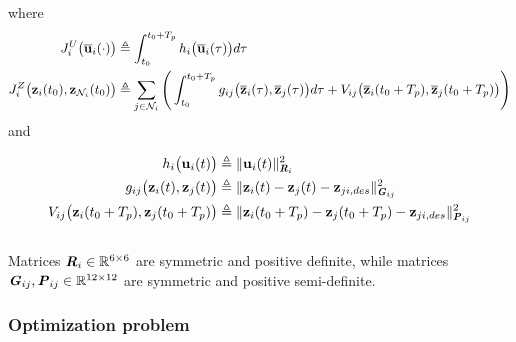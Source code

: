 where
\begin{align}
  J_i^U \big(\overline{\bm{\mathbf{u}}}_i (\cdot)\big) &\triangleq
    \int_{t_0}^{t_0 + T_p} h_i \big(\overline{\bm{\mathbf{u}}}_i (\tau)\big) d \tau \\
  J_i^Z \big(\bm{\mathbf{z}}_i (t_0), \bm{\mathbf{z}}_{\mathcal{N}_i}(t_0)\big) & \triangleq
    \sum_{j \in \mathcal{N}_i} \Bigg(\int_{t_0}^{t_0 + T_p} g_{ij} \big(\overline{\bm{\mathbf{z}}}_i (\tau), \overline{\bm{\mathbf{z}}}_j (\tau)\big) d \tau +
    V_{ij} \big(\overline{\bm{\mathbf{z}}}_i (t_0 + T_p), \overline{\bm{\mathbf{z}}}_j (t_0 + T_p)\big)\Bigg)
\end{align}
and

\begin{align}
  h_i \big(\bm{\mathbf{u}}_i(t) \big)
    &\triangleq \| \bm{\mathbf{u}}_i(t)\|_{\bm{\mathit{R}}_i}^2 \\
  g_{ij}\big(\bm{\mathbf{z}}_i(t), \bm{\mathbf{z}}_j(t)\big)
    & \triangleq \| \bm{\mathbf{z}}_i(t) - \bm{\mathbf{z}}_j(t) - \bm{\mathbf{z}}_{ji,des} \|_{\bm{\mathit{G}}_{ij}}^2 \\
  V_{ij} \big(\bm{\mathbf{z}}_i (t_0 + T_p), \bm{\mathbf{z}}_j (t_0 + T_p)\big)
    & \triangleq \| \bm{\mathbf{z}}_i(t_0 + T_p) - \bm{\mathbf{z}}_j(t_0 + T_p) - \bm{\mathbf{z}}_{ji,des} \|_{\bm{\mathit{P}}_{ij}}^2
\end{align}\\
Matrices $\bm{\mathit{R}}_i \in \mathbb{R}^{6 \times 6}$ are symmetric and positive
definite, while matrices $\bm{\mathit{G}}_{ij}, \bm{\mathit{P}}_{ij} \in \mathbb{R}^{12 \times 12}$ are
symmetric and positive semi-definite.



\subsubsection{Optimization problem}

